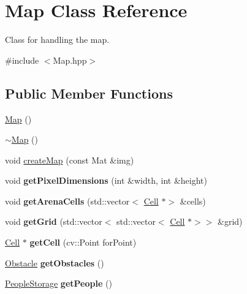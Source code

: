 \hypertarget{class_map}{}\section{Map Class Reference}
\label{class_map}


Class for handling the map.  




{\ttfamily \#include $<$Map.\+hpp$>$}

\subsection*{Public Member Functions}
\begin{DoxyCompactItemize}
\item 
\mbox{\hyperlink{class_map_a0f5ad0fd4563497b4214038cbca8b582}{Map}} ()
\item 
\mbox{\hyperlink{class_map_aa403fbe09394ccf39747588f5168e3b2}{$\sim$\+Map}} ()
\item 
void \mbox{\hyperlink{class_map_a02537656e91e97077dfdfc5d84c3027b}{create\+Map}} (const Mat \&img)
\item 
\mbox{\label{class_map_aaba4246a4400e03db7218828402994df}} 
void {\bfseries get\+Pixel\+Dimensions} (int \&width, int \&height)
\item 
\mbox{\label{class_map_a8eb8b7841ba4ccf02646fe2c288c7fc5}} 
void {\bfseries get\+Arena\+Cells} (std\+::vector$<$ \mbox{\hyperlink{class_cell}{Cell}} $\ast$$>$ \&cells)
\item 
\mbox{\label{class_map_a0bc04be78a3badfaa364bc3f48fbfdfe}} 
void {\bfseries get\+Grid} (std\+::vector$<$ std\+::vector$<$ \mbox{\hyperlink{class_cell}{Cell}} $\ast$$>$$>$ \&grid)
\item 
\mbox{\label{class_map_adf1aceac80d4cbfc91a5cf158c009c9d}} 
\mbox{\hyperlink{class_cell}{Cell}} $\ast$ {\bfseries get\+Cell} (cv\+::\+Point for\+Point)
\item 
\mbox{\label{class_map_a17022b64f602dfd4d45a84c0ffa92270}} 
\mbox{\hyperlink{class_obstacle}{Obstacle}} {\bfseries get\+Obstacles} ()
\item 
\mbox{\label{class_map_a26df03922b64a9676a0a457e8d6a69af}} 
\mbox{\hyperlink{struct_people_storage}{People\+Storage}} {\bfseries get\+People} ()
$$
\end{DoxyCompactItemize}
